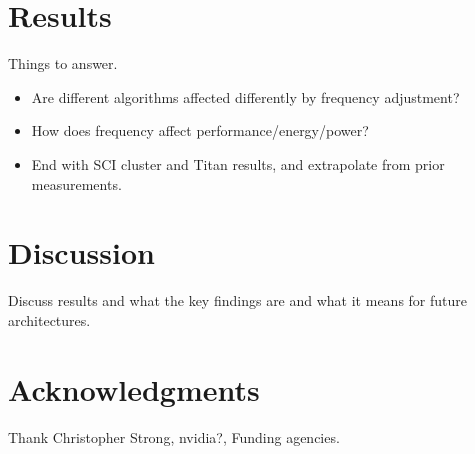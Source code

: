 \documentclass{sig-alternate}
\begin{document}
\section{Results}

{\color{red} Things to answer.}
\begin{itemize}
\item Are different algorithms affected differently by frequency adjustment?
\item How does frequency affect performance/energy/power?
\item End with SCI cluster and Titan results, and extrapolate from prior 
measurements.
\end{itemize}

\section{Discussion}
Discuss results and what the key findings are and what it means for future architectures.


\section{Acknowledgments}
Thank Christopher Strong, nvidia?, Funding agencies.


%

 

\end{document}
